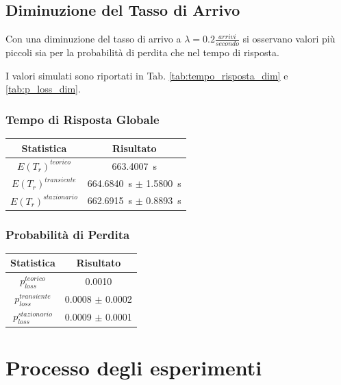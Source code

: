 \documentclass{article}
\begin{document}
\subsection{Diminuzione del Tasso di Arrivo}

Con una diminuzione del tasso di arrivo a $\lambda = 0.2 \frac{arrivi}{secondo}$ si osservano valori più piccoli sia per la probabilità di perdita che nel tempo di risposta.  

I valori simulati sono riportati in Tab. \ref{tab:tempo_risposta_dim} e \ref{tab:p_loss_dim}.

\subsubsection{Tempo di Risposta Globale}

\begin{center}\label{tab:tempo_risposta_dim}
\begin{tabular}{|c|c|}
\hline
\textbf{Statistica} & \textbf{Risultato}\\
 \hline
\(E(T_{r})^{teorico}\) & 663.4007\ s \\
\hline
\(E(T_{r})^{transiente}\) & 664.6840\ s $\pm$ 1.5800\ s\\
\hline
\(E(T_{r})^{stazionario}\) & 662.6915\ s $\pm$ 0.8893\ s\\
 \hline
\end{tabular}
\end{center}

\subsubsection{Probabilità di Perdita}

\begin{center}\label{tab:p_loss_dim}
\begin{tabular}{|c|c|}
\hline
\textbf{Statistica} & \textbf{Risultato}\\
 \hline
\(p_{loss}^{teorico}\) & 0.0010 \\
\hline
\(p_{loss}^{transiente}\) &  0.0008 $\pm$ 0.0002\\
\hline
\(p_{loss}^{stazionario}\) & 0.0009 $\pm$ 0.0001\\
 \hline
\end{tabular}
\end{center}


\section{Processo degli esperimenti}
\end{document}
